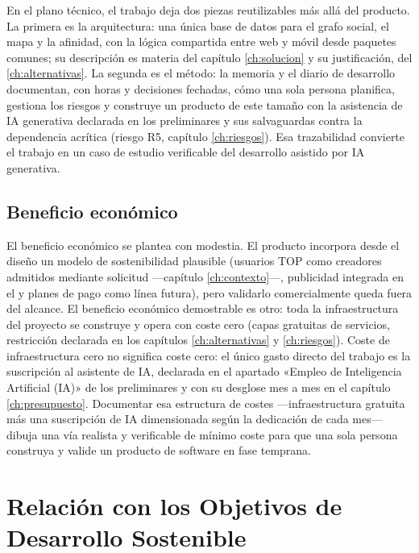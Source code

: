 En el plano técnico, el trabajo deja dos piezas reutilizables más allá del producto.
La primera es la arquitectura: una única base de datos para el grafo social, el mapa y la afinidad, con la lógica compartida entre web y móvil desde paquetes comunes; su descripción es materia del capítulo \ref{ch:solucion} y su justificación, del \ref{ch:alternativas}.
La segunda es el método: la memoria y el diario de desarrollo documentan, con horas y decisiones fechadas, cómo una sola persona planifica, gestiona los riesgos y construye un producto de este tamaño con la asistencia de \ac{IA} generativa declarada en los preliminares y sus salvaguardas contra la dependencia acrítica (riesgo R5, capítulo \ref{ch:riesgos}).
Esa trazabilidad convierte el trabajo en un caso de estudio verificable del desarrollo asistido por \ac{IA} generativa.

\subsection{Beneficio económico}
\label{sec:beneficios-economico}

El beneficio económico se plantea con modestia.
El producto incorpora desde el diseño un modelo de sostenibilidad plausible (usuarios TOP como creadores admitidos mediante solicitud —capítulo \ref{ch:contexto}—, publicidad integrada en el  y planes de pago como línea futura), pero validarlo comercialmente queda fuera del alcance.
El beneficio económico demostrable es otro: toda la infraestructura del proyecto se construye y opera con coste cero (capas gratuitas de servicios, restricción declarada en los capítulos \ref{ch:alternativas} y \ref{ch:riesgos}).
Coste de infraestructura cero no significa coste cero: el único gasto directo del trabajo es la suscripción al asistente de \ac{IA}, declarada en el apartado «Empleo de Inteligencia Artificial (IA)» de los preliminares y con su desglose mes a mes en el capítulo \ref{ch:presupuesto}.
Documentar esa estructura de costes —infraestructura gratuita más una suscripción de \ac{IA} dimensionada según la dedicación de cada mes— dibuja una vía realista y verificable de mínimo coste para que una sola persona construya y valide un producto de software en fase temprana.

\section{Relación con los Objetivos de Desarrollo Sostenible}
\label{sec:ods}

